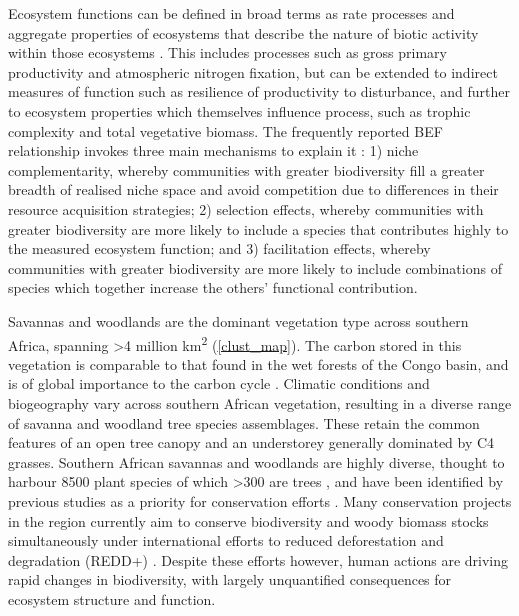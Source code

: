 \documentclass[11pt,a4paper]{article}
\newcommand{\textapprox}{\raisebox{0.5ex}{\texttildelow}}  %
\begin{document}
Ecosystem functions can be defined in broad terms as rate processes and aggregate properties of ecosystems that describe the nature of biotic activity within those ecosystems \citep{Jax2005}. This includes processes such as gross primary productivity and atmospheric nitrogen fixation, but can be extended to indirect measures of function such as resilience of productivity to disturbance, and further to ecosystem properties which themselves influence process, such as trophic complexity and total vegetative biomass. The frequently reported BEF relationship invokes three main mechanisms to explain it \citep{Tilman2014}: 1) niche complementarity, whereby communities with greater biodiversity fill a greater breadth of realised niche space and avoid competition due to differences in their resource acquisition strategies; 2) selection effects, whereby communities with greater biodiversity are more likely to include a species that contributes highly to the measured ecosystem function; and 3) facilitation effects, whereby communities with greater biodiversity are more likely to include combinations of species which together increase the others' functional contribution.

Savannas and woodlands are the dominant vegetation type across southern Africa, spanning >4 million km\textsuperscript{2} \citep{White1987, Ratnam2011, Ryan2016} (\autoref{clust_map}). The carbon stored in this vegetation is comparable to that found in the wet forests of the Congo basin, and is of global importance to the carbon cycle \citep{Houghton2009, Mayaux2008}. Climatic conditions and biogeography vary across southern African vegetation, resulting in a diverse range of savanna and woodland tree species assemblages. These retain the common features of an open tree canopy and an understorey generally dominated by C4 grasses. Southern African savannas and woodlands are highly diverse, thought to harbour \textapprox{}8500 plant species of which >300 are trees \citep{Frost1996}, and have been identified by previous studies as a priority for conservation efforts \citep{Byers2001, Mittermeier2003}. Many conservation projects in the region currently aim to conserve biodiversity and woody biomass stocks simultaneously under international efforts to reduced deforestation and degradation (REDD+) \citep{Hinsley2015}. Despite these efforts however, human actions are driving rapid changes in biodiversity, with largely unquantified consequences for ecosystem structure and function.
\end{document}
